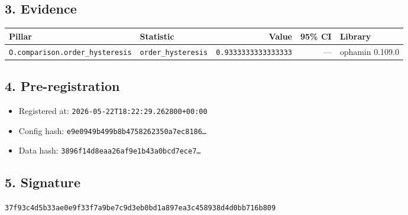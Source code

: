 \documentclass{article}
\begin{document}
\subsection*{3. Evidence}
\begin{tabular}{llrrl}\toprule
\textbf{Pillar} & \textbf{Statistic} & \textbf{Value} & \textbf{95\% CI} & \textbf{Library} \\\midrule
\texttt{O.comparison.order\_hysteresis} & \texttt{order\_hysteresis} & \texttt{0.9333333333333333} & --- & ophamin 0.109.0 \\
\bottomrule\end{tabular}
\subsection*{4. Pre-registration}
\begin{itemize}
\item Registered at: \texttt{2026-05-22T18:22:29.262800+00:00}
\item Config hash: \texttt{e9e0949b499b8b4758262350a7ec8186\dots}
\item Data hash: \texttt{3896f14d8eaa26af9e1b43a0bcd7ece7\dots}
\end{itemize}
\subsection*{5. Signature}
\texttt{37f93c4d5b33ae0e9f33f7a9be7c9d3eb0bd1a897ea3c458938d4d0bb716b809}\\
\end{document}
